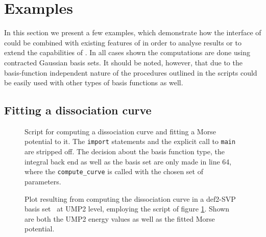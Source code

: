 \newcommand{\scipy}{\texttt{scipy}\xspace}

\section{Examples}
\label{sec:MolsturmExamples}

In this section we present a few examples,
which demonstrate how the \python interface of \molsturm
could be combined with existing features of \python
in order to analyse results or to extend the capabilities of \molsturm.
In all cases shown the computations are done using contracted
Gaussian basis sets.
It should be noted, however,
that due to the basis-function independent nature of \molsturm
the procedures outlined in the scripts could be easily used
with other types of basis functions as well.

\subsection{Fitting a dissociation curve}
\label{sec:ex:data}

\newcommand{\ldict}{59--63\xspace}
\newcommand{\lcall}{64\xspace}
\newcommand{\lextract}{34\xspace}

\begin{figure}
	\centering
	\begin{minipage}{0.58\textwidth}
	
	\end{minipage}
	\caption[\python script computing a  dissociation curve]{
		Script for computing a  dissociation curve
		and fitting a Morse potential to it.
		The \texttt{import} statements and the explicit call to \texttt{main}
		are stripped off.
		The decision about the basis function type, the integral back end
		as well as the basis set are only made in line \lcall,
		where the \texttt{compute\_curve} is called with the chosen
		set of parameters.
	}
	\label{fig:codeDissociation}
\end{figure}

\begin{figure}
	\centering
	\caption[Result from calling the python script of figure \ref{fig:codeDissociation}]{
		Plot resulting from computing the 
		dissociation curve in a def2-SVP basis set~\cite{Weigend2005}
		at UMP2 level,
		employing the script of figure \ref{fig:codeDissociation}.
		Shown are both the UMP2 energy values as well as the fitted
		Morse potential.}
	\label{fig:dissociation}
\end{figure}

